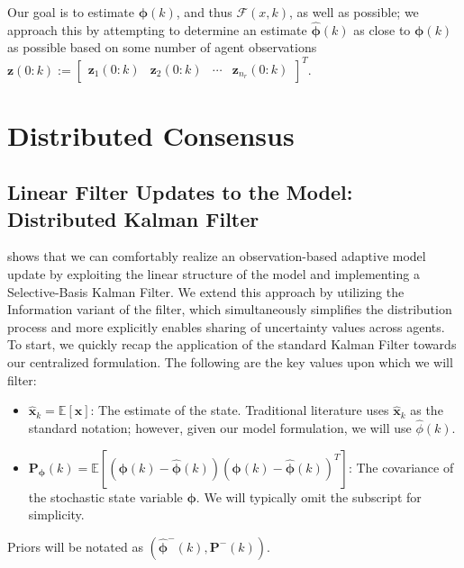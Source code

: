 Our goal is to estimate $\bm{\phi}(k)$, and thus $\mathcal{F}(x,k)$, as well as possible; we approach this by attempting to determine an estimate $\hat{\bm{\phi}}(k)$ as close to $\bm{\phi}(k)$ as possible based on some number of agent observations $\mathbf{z}(0:k):=\begin{bmatrix} \mathbf{z}_1(0:k) & \mathbf{z}_2(0:k) & \cdots & \mathbf{z}_{n_r}(0:k) \end{bmatrix}^T$.

\section{Distributed Consensus} \label{sec:distrib-consensus}

\subsection{Linear Filter Updates to the Model: Distributed Kalman Filter} \label{sec:dist-kalman-filt}

\cite{cui2015mutual} shows that we can comfortably realize an observation-based adaptive model update by exploiting the linear structure of the model and implementing a Selective-Basis Kalman Filter. We extend this approach by utilizing the Information variant of the filter, which simultaneously simplifies the distribution process and more explicitly enables sharing of uncertainty values across agents. To start, we quickly recap the application of the standard Kalman Filter towards our centralized formulation. The following are the key values upon which we will filter:

\begin{itemize}
    \item $\hat{\mathbf{x}}_k = \mathbb{E}\left[\mathbf{x}\right]$: The estimate of the state. Traditional literature uses $\hat{\mathbf{x}}_k$ as the standard notation; however, given our model formulation, we will use $\hat{\phi}(k)$.
    \item $\mathbf{P}_{\bm{\phi}}(k)=\mathbb{E}\left[(\bm{\phi}(k)-\hat{\bm{\phi}}(k))(\bm{\phi}(k)-\hat{\bm{\phi}}(k))^T\right]$: The covariance of the stochastic state variable $\bm{\phi}$. We will typically omit the subscript for simplicity.
\end{itemize}

Priors will be notated as $\left(\hat{\bm{\phi}}^-(k), \mathbf{P}^-(k)\right)$.

